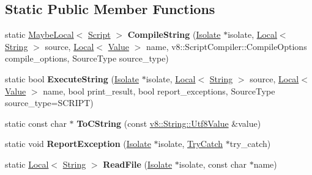 \subsection*{Static Public Member Functions}
\begin{DoxyCompactItemize}
\item 
static \hyperlink{classv8_1_1_maybe_local}{Maybe\+Local}$<$ \hyperlink{classv8_1_1_script}{Script} $>$ {\bfseries Compile\+String} (\hyperlink{classv8_1_1_isolate}{Isolate} $\ast$isolate, \hyperlink{classv8_1_1_local}{Local}$<$ \hyperlink{classv8_1_1_string}{String} $>$ source, \hyperlink{classv8_1_1_local}{Local}$<$ \hyperlink{classv8_1_1_value}{Value} $>$ name, v8\+::\+Script\+Compiler\+::\+Compile\+Options compile\+\_\+options, Source\+Type source\+\_\+type)\hypertarget{classv8_1_1_shell_a8a2bb13c214e19e733b8121fd9c12a66}{}\label{classv8_1_1_shell_a8a2bb13c214e19e733b8121fd9c12a66}

\item 
static bool {\bfseries Execute\+String} (\hyperlink{classv8_1_1_isolate}{Isolate} $\ast$isolate, \hyperlink{classv8_1_1_local}{Local}$<$ \hyperlink{classv8_1_1_string}{String} $>$ source, \hyperlink{classv8_1_1_local}{Local}$<$ \hyperlink{classv8_1_1_value}{Value} $>$ name, bool print\+\_\+result, bool report\+\_\+exceptions, Source\+Type source\+\_\+type=S\+C\+R\+I\+PT)\hypertarget{classv8_1_1_shell_a5fa4fac8591781915c9709c29f1a8e70}{}\label{classv8_1_1_shell_a5fa4fac8591781915c9709c29f1a8e70}

\item 
static const char $\ast$ {\bfseries To\+C\+String} (const \hyperlink{classv8_1_1_string_1_1_utf8_value}{v8\+::\+String\+::\+Utf8\+Value} \&value)\hypertarget{classv8_1_1_shell_a4be20a6785bf3b70e8cb546afbae5282}{}\label{classv8_1_1_shell_a4be20a6785bf3b70e8cb546afbae5282}

\item 
static void {\bfseries Report\+Exception} (\hyperlink{classv8_1_1_isolate}{Isolate} $\ast$isolate, \hyperlink{classv8_1_1_try_catch}{Try\+Catch} $\ast$try\+\_\+catch)\hypertarget{classv8_1_1_shell_a45ffe976e0fcd45629b6ff5f03e80943}{}\label{classv8_1_1_shell_a45ffe976e0fcd45629b6ff5f03e80943}

\item 
static \hyperlink{classv8_1_1_local}{Local}$<$ \hyperlink{classv8_1_1_string}{String} $>$ {\bfseries Read\+File} (\hyperlink{classv8_1_1_isolate}{Isolate} $\ast$isolate, const char $\ast$name)\hypertarget{classv8_1_1_shell_a7031e2aefd0be84b22df14c3e0abedcc}{}\label{classv8_1_1_shell_a7031e2aefd0be84b22df14c3e0abedcc}


\end{DoxyCompactItemize}

